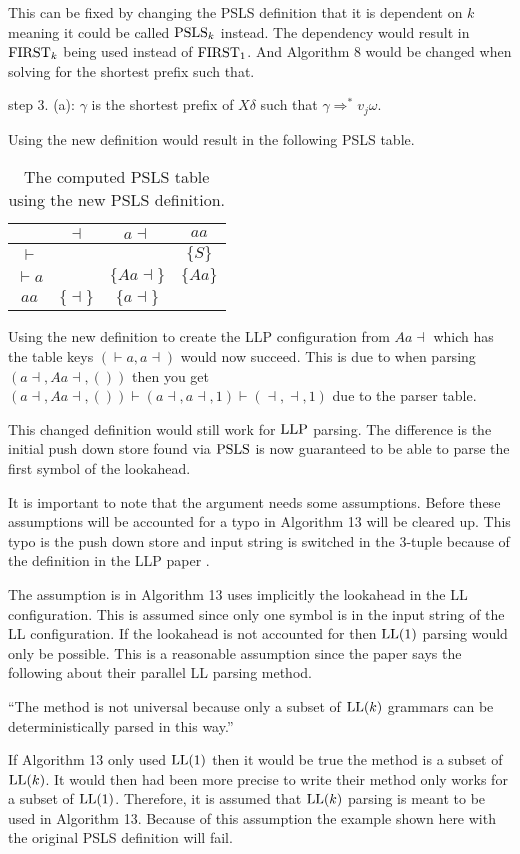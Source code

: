 This can be fixed by changing the PSLS definition that it is dependent on $k$ meaning it could be called $\text{PSLS}_k$ instead. The dependency would result in $\text{FIRST}_k$ being used instead of $\text{FIRST}_1$. And Algorithm 8 would be changed when solving for the shortest prefix such that.
\begin{center}
    step 3. (a): $\gamma$ is the shortest prefix of $X\delta$ such that $\gamma \Rightarrow^* v_j \omega$. 
\end{center}
Using the new definition would result in the following PSLS table.
\begin{table}[H]
    \centering
    \begin{tabular}{c|c|c|c}
        & $\dashv$ & $a\dashv$ & $aa$ \\ \hline
        $\vdash$ & & & $\{S\}$ \\\hline
        $\vdash a$ & & $\{Aa\dashv\}$ & $\{Aa\}$ \\\hline
        $aa$ & $\{\dashv\}$ & $\{a\dashv\}$ & 
    \end{tabular}
    \caption{The computed PSLS table using the new PSLS definition.}
\end{table}
\noindent Using the new definition to create the LLP configuration from $Aa\dashv$ which has the table keys $(\vdash a,a \dashv)$ would now succeed. This is due to when parsing $(a \dashv, Aa\dashv, ())$ then you get $(a \dashv, Aa\dashv, ()) \vdash (a \dashv, a\dashv, 1) \vdash ( \dashv, \dashv, 1)$ due to the parser table.

This changed definition would still work for $\text{LLP}$ parsing. The difference is the initial push down store found via $\text{PSLS}$ is now guaranteed to be able to parse the first symbol of the lookahead.

It is important to note that the argument needs some assumptions. Before these assumptions will be accounted for a typo in Algorithm 13 will be cleared up. This typo is the push down store and input string is switched in the 3-tuple because of the definition in the LLP paper \cite[5]{Vagner2007}.

The assumption is in Algorithm 13 uses implicitly the lookahead in the LL configuration. This is assumed since only one symbol is in the input string of the LL configuration. If the lookahead is not accounted for then $\text{LL}(1)$ parsing would only be possible. This is a reasonable assumption since the paper says the following about their parallel LL parsing method.
\begin{center}
    ``The method is not universal because only a subset of $\text{LL}(k)$ grammars can be deterministically parsed in this way.'' \cite[2]{Vagner2007}
\end{center}
If Algorithm 13 only used $\text{LL}(1)$ then it would be true the method is a subset of $\text{LL}(k)$. It would then had been more precise to write their method only works for a subset of $\text{LL}(1)$. Therefore, it is assumed that $\text{LL}(k)$ parsing is meant to be used in Algorithm 13. Because of this assumption the example shown here with the original PSLS definition will fail.

